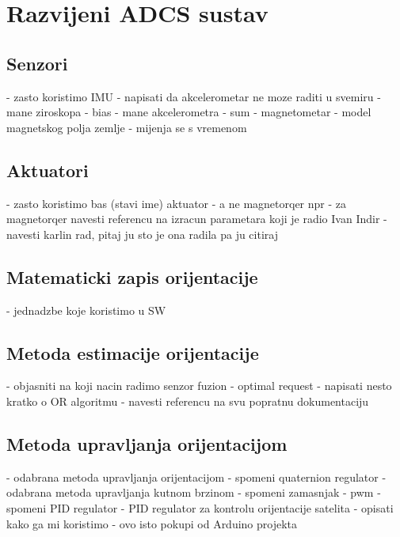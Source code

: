 \documentclass[times, utf8, diplomski, numeric]{templates/template}
\begin{document}
\chapter{Razvijeni ADCS sustav}{
    \section{Senzori}{
        - zasto koristimo IMU
            - napisati da akcelerometar ne moze raditi u svemiru
            - mane ziroskopa
                - bias
            - mane akcelerometra
                - sum
            - magnetometar
                - model magnetskog polja zemlje
                    - mijenja se s vremenom
    }

    \section{Aktuatori}{
        - zasto koristimo bas (stavi ime) aktuator 
            - a ne magnetorqer npr
            - za magnetorqer navesti referencu na izracun parametara koji je radio Ivan Indir
            - navesti karlin rad, pitaj ju sto je ona radila pa ju citiraj
    }

    \section{Matematicki zapis orijentacije}{
        - jednadzbe koje koristimo u SW
    }

    \section{Metoda estimacije orijentacije}{
        - objasniti na koji nacin radimo senzor fuzion
            - optimal request
                - napisati nesto kratko o OR algoritmu
                - navesti referencu na svu popratnu dokumentaciju
    }

    \section{Metoda upravljanja orijentacijom}{
        - odabrana metoda upravljanja orijentacijom
            - spomeni quaternion regulator
        - odabrana metoda upravljanja kutnom brzinom
            - spomeni zamasnjak
            - pwm
            - spomeni PID regulator
            - PID regulator za kontrolu orijentacije satelita
                - opisati kako ga mi koristimo
                - ovo isto pokupi od Arduino projekta
    }

}
\end{document}
